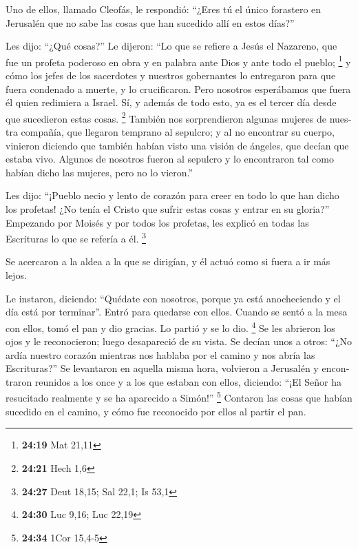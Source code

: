 \begin{paracol}{2}
\begin{otherlanguage}{english}
 Uno de ellos, llamado Cleofás, le respondió: ``¿Eres tú
el único forastero en Jerusalén que no sabe las cosas que han sucedido
allí en estos días?''

 Les dijo: ``¿Qué cosas?'' Le dijeron: ``Lo que se
refiere a Jesús el Nazareno, que fue un profeta poderoso en obra y en
palabra ante Dios y ante todo el pueblo; \footnote{\textbf{24:19} Mat
  21,11}  y cómo los jefes de los sacerdotes y nuestros
gobernantes lo entregaron para que fuera condenado a muerte, y lo
crucificaron.  Pero nosotros esperábamos que fuera él
quien redimiera a Israel. Sí, y además de todo esto, ya es el tercer día
desde que sucedieron estas cosas. \footnote{\textbf{24:21} Hech 1,6}
 También nos sorprendieron algunas mujeres de nuestra
compañía, que llegaron temprano al sepulcro;  y al no
encontrar su cuerpo, vinieron diciendo que también habían visto una
visión de ángeles, que decían que estaba vivo.  Algunos
de nosotros fueron al sepulcro y lo encontraron tal como habían dicho
las mujeres, pero no lo vieron.''

 Les dijo: ``¡Pueblo necio y lento de corazón para creer
en todo lo que han dicho los profetas!  ¿No tenía el
Cristo que sufrir estas cosas y entrar en su gloria?'' 
Empezando por Moisés y por todos los profetas, les explicó en todas las
Escrituras lo que se refería a él. \footnote{\textbf{24:27} Deut 18,15;
  Sal 22,1; Is 53,1}

 Se acercaron a la aldea a la que se dirigían, y él actuó
como si fuera a ir más lejos.

 Le instaron, diciendo: ``Quédate con nosotros, porque ya
está anocheciendo y el día está por terminar''. Entró para quedarse con
ellos.  Cuando se sentó a la mesa con ellos, tomó el pan
y dio gracias. Lo partió y se lo dio. \footnote{\textbf{24:30} Luc 9,16;
  Luc 22,19}  Se les abrieron los ojos y le reconocieron;
luego desapareció de su vista.  Se decían unos a otros:
``¿No ardía nuestro corazón mientras nos hablaba por el camino y nos
abría las Escrituras?''  Se levantaron en aquella misma
hora, volvieron a Jerusalén y encontraron reunidos a los once y a los
que estaban con ellos,  diciendo: ``¡El Señor ha
resucitado realmente y se ha aparecido a Simón!'' \footnote{\textbf{24:34}
  1Cor 15,4-5}  Contaron las cosas que habían sucedido en
el camino, y cómo fue reconocido por ellos al partir el pan.


\end{otherlanguage}
\end{paracol}
